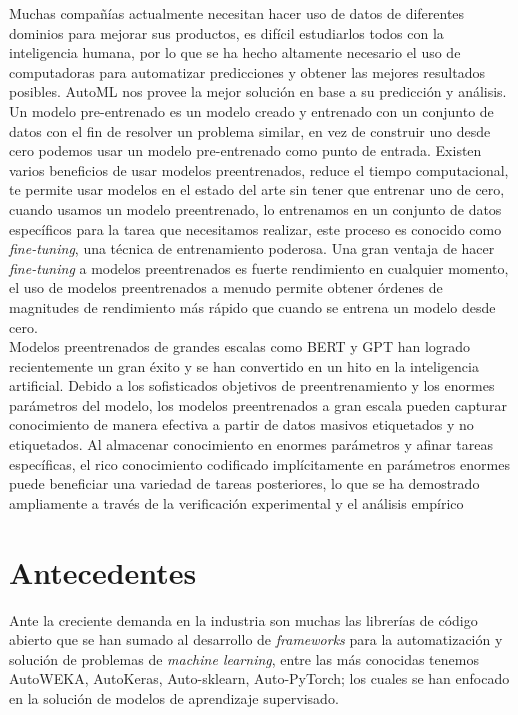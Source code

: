  Muchas compañías actualmente necesitan hacer uso de datos de diferentes dominios para mejorar sus productos, es difícil estudiarlos todos con la inteligencia humana, por lo que se ha hecho altamente necesario el uso de computadoras para automatizar predicciones y obtener las mejores resultados posibles. AutoML nos provee la mejor solución en base a su predicción y análisis.\\

Un modelo pre-entrenado es un modelo creado y entrenado con un conjunto de datos con el fin de resolver un problema similar, en vez de construir uno desde cero podemos usar un modelo pre-entrenado como punto de entrada. Existen varios beneficios de usar modelos preentrenados, reduce el tiempo computacional, te permite usar modelos en el estado del arte sin tener que entrenar uno de cero, cuando usamos un modelo preentrenado, lo entrenamos en un conjunto de datos específicos para la tarea que necesitamos realizar, este proceso es conocido como \textit{fine-tuning}, una técnica de entrenamiento poderosa. Una gran ventaja de hacer \textit{fine-tuning} a modelos preentrenados es fuerte rendimiento en cualquier momento, el uso de modelos preentrenados a menudo permite obtener órdenes de magnitudes de rendimiento más rápido que cuando se entrena un modelo desde cero. \\

Modelos preentrenados de grandes escalas como BERT y GPT han logrado recientemente un gran éxito y se han convertido en un hito en la inteligencia artificial. Debido a los sofisticados objetivos de preentrenamiento y los enormes parámetros del modelo, los modelos preentrenados a gran escala pueden capturar conocimiento de manera efectiva a partir de datos masivos etiquetados y no etiquetados. Al almacenar conocimiento en enormes parámetros y afinar tareas específicas, el rico conocimiento codificado implícitamente en parámetros enormes puede beneficiar una variedad de tareas posteriores, lo que se ha demostrado ampliamente a través de la verificación experimental y el análisis empírico \\

\section*{Antecedentes}
Ante la creciente demanda en la industria son muchas las librerías de código abierto que se han sumado al desarrollo de \textit{frameworks} para la automatización y solución de problemas de \textit{machine learning}, entre las más conocidas tenemos AutoWEKA, AutoKeras, Auto-sklearn, Auto-PyTorch; los cuales se han enfocado en la solución de modelos de aprendizaje supervisado.\\

